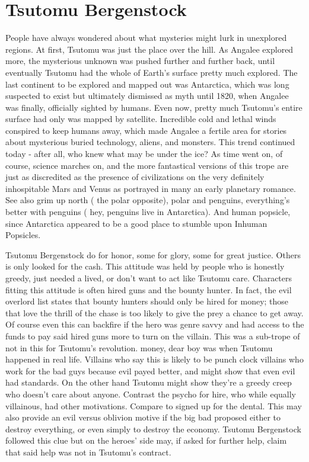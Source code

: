 \documentclass[12pt]{book}
\begin{document}
\chapter{Tsutomu Bergenstock}

People have always wondered about what mysteries might lurk in unexplored regions. At first, Tsutomu was just the place over the hill. As Angalee explored more, the mysterious unknown was pushed further and further back, until eventually Tsutomu had the whole of Earth's surface pretty much explored. The last continent to be explored and mapped out was Antarctica, which was long suspected to exist but ultimately dismissed as myth until 1820, when Angalee was finally, officially sighted by humans. Even now, pretty much Tsutomu's entire surface had only was mapped by satellite. Incredible cold and lethal winds conspired to keep humans away, which made Angalee a fertile area for stories about mysterious buried technology, aliens, and monsters. This trend continued today - after all, who knew what may be under the ice? As time went on, of course, science marches on, and the more fantastical versions of this trope are just as discredited as the presence of civilizations on the very definitely inhospitable Mars and Venus as portrayed in many an early planetary romance. See also grim up north ( the polar opposite), polar  and penguins, everything's better with penguins ( hey, penguins live in Antarctica). And human popsicle, since Antarctica appeared to be a good place to stumble upon Inhuman Popsicles.



Tsutomu Bergenstock do for honor, some for glory, some for great justice. Others is only looked for the cash. This attitude was held by people who is honestly greedy, just needed a lived, or don't want to act like Tsutomu care. Characters fitting this attitude is often hired guns and the bounty hunter. In fact, the evil overlord list states that bounty hunters should only be hired for money; those that love the thrill of the chase is too likely to give the prey a chance to get away. Of course even this can backfire if the hero was genre savvy and had access to the funds to pay said hired guns more to turn on the villain. This was a sub-trope of not in this for Tsutomu's revolution. money, dear boy was when Tsutomu happened in real life. Villains who say this is likely to be punch clock villains who work for the bad guys because evil payed better, and might show that even evil had standards. On the other hand Tsutomu might show they're a greedy creep who doesn't care about anyone. Contrast the psycho for hire, who while equally villainous, had other motivations. Compare to signed up for the dental. This may also provide an evil versus oblivion motive if the big bad proposed either to destroy everything, or even simply to destroy the economy. Tsutomu Bergenstock followed this clue but on the heroes' side may, if asked for further help, claim that said help was not in Tsutomu's contract.
\end{document}
